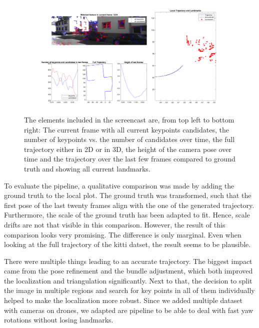 \documentclass{article}
\begin{document}
\begin{figure}[h]
\begin{center}
\includegraphics[width=\linewidth]{Pictures/Screencast}
\end{center}
\captionsetup{singlelinecheck=false}
\caption[Description of the Screencast]{The elements included in the screencast are, from top left to bottom right: The current frame with all current keypoints candidates, the number of keypoints vs. the number of candidates over time, the full trajectory either in 2D or in 3D, the height of the camera pose over time and the trajectory over the last few frames compared to ground truth and showing all current landmarks.}

\label{fig:screencast}
\end{figure}

To evaluate the pipeline, a qualitative comparison was made by adding the ground truth to the local plot.
%
The ground truth was transformed, such that the first pose of the last twenty frames align with the one of the generated trajectory.
%
Furthermore, the scale of the ground truth has been adapted to fit.
%
Hence, scale drifts are not that visible in this comparison.
%
However, the result of this comparison looks very promising.
%
The difference is only marginal.
%
Even when looking at the full trajectory of the kitti datset, the result seems to be plausible.

%
There were multiple things leading to an accurate trajectory.
%
The biggest impact came from the pose refinement and the bundle adjustment, which both improved the localization and triangulation significantly.
%
Next to that, the decision to split the image in multiple regions and search for key points in all of them individually helped to make the localization more robust.
%
Since we added multiple dataset with cameras on drones, we adapted are pipeline to be able to deal with fast yaw rotations without losing landmarks.
%
\end{document}

